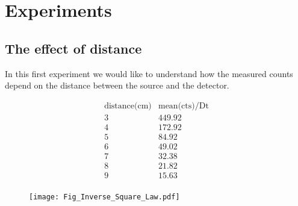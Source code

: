 \section{Experiments}

\subsection{The effect of distance}
\label{distance}


In this first experiment we would like to understand how the measured counts depend on the distance between the source and the detector.

\begin{displaymath}
\begin{array}{cc}
 \text{distance(cm)} & \text{mean(cts)/Dt} 
   \\
3  &  449.92   \\
4  &  172.92   \\
5  &  84.92    \\
6  &  49.02    \\
7  &  32.38    \\
8  &  21.82    \\
9  &  15.63    \\
\end{array}
\end{displaymath}

\begin{figure}
  \texttt{[image: Fig\_Inverse\_Square\_Law.pdf]}
\end{figure}



